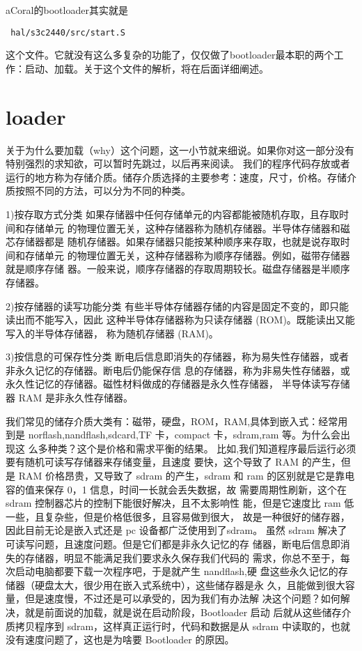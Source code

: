 aCoral的bootloader其实就是 
\begin{lstlisting}
 hal/s3c2440/src/start.S 
\end{lstlisting}
这个文件。它就没有这么多复杂的功能了，仅仅做了bootloader最本职的两个工作：启动、加载。关于这个文件的解析，将在后面详细阐述。


\section{loader}
关于为什么要加载（why）这个问题，这一小节就来细说。如果你对这一部分没有特别强烈的求知欲，可以暂时先跳过，以后再来阅读。
我们的程序代码存放或者运行的地方称为存储介质。储存介质选择的主要参考：速度，尺寸，价格。存储介质按照不同的方法，可以分为不同的种类。

1)按存取方式分类
如果存储器中任何存储单元的内容都能被随机存取，且存取时间和存储单元
的物理位置无关，这种存储器称为随机存储器。半导体存储器和磁芯存储器都是
随机存储器。如果存储器只能按某种顺序来存取，也就是说存取时间和存储单元
的物理位置无关，这种存储器称为顺序存储器。例如，磁带存储器就是顺序存储
器。一般来说，顺序存储器的存取周期较长。磁盘存储器是半顺序存储器。

2)按存储器的读写功能分类
有些半导体存储器存储的内容是固定不变的，即只能读出而不能写入，因此
这种半导体存储器称为只读存储器 (ROM)。既能读出又能写入的半导体存储器，
称为随机存储器 (RAM)。

3)按信息的可保存性分类
断电后信息即消失的存储器，称为易失性存储器，或者非永久记忆的存储器。断电后仍能保存信
息的存储器，称为非易失性存储器，或永久性记忆的存储器。磁性材料做成的存储器是永久性存储器，
半导体读写存储器 RAM 是非永久性存储器。

我们常见的储存介质大类有：磁带，硬盘，ROM，RAM,具体到嵌入式：经常用到是
norflash,nandflash,sdcard,TF 卡，compact 卡，sdram,ram 等。为什么会出现这
么多种类？这个是价格和需求平衡的结果。
比如,我们知道程序最后运行必须要有随机可读写存储器来存储变量，且速度
要快，这个导致了 RAM 的产生，但是 RAM 价格昂贵，又导致了 sdram 的产生，sdram
和 ram 的区别就是它是靠电容的值来保存 0，1 信息，时间一长就会丢失数据，故
需要周期性刷新，这个在 sdram 控制器芯片的控制下能很好解决，且不太影响性
能，但是它速度比 ram 低一些，且复杂些，但是价格低很多，且容易做到很大，
故是一种很好的储存器，因此目前无论是嵌入式还是 pc 设备都广泛使用到了sdram。
虽然 sdram 解决了可读写问题，且速度问题。但是它们都是非永久记忆的存
储器，断电后信息即消失的存储器，明显不能满足我们要求永久保存我们代码的
需求，你总不至于，每次启动电脑都要下载一次程序吧，于是就产生 nandflash,硬
盘这些永久记忆的存储器（硬盘太大，很少用在嵌入式系统中），这些储存器是永
久，且能做到很大容量，但是速度慢，不过还是可以承受的，因为我们有办法解
决这个问题？如何解决，就是前面说的加载，就是说在启动阶段，Bootloader 启动
后就从这些储存介质拷贝程序到 sdram，这样真正运行时，代码和数据是从 sdram
中读取的，也就没有速度问题了，这也是为啥要 Bootloader 的原因。

